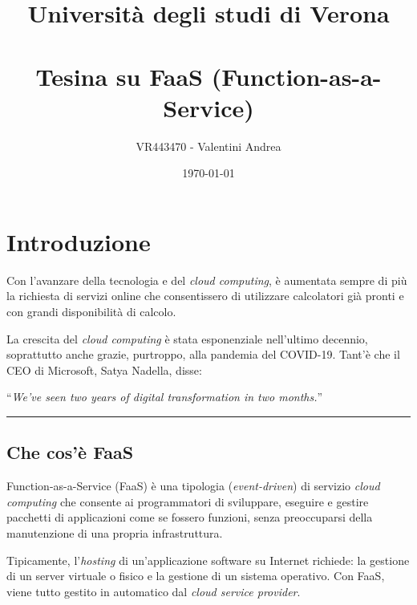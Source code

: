 \documentclass[a4paper]{article}
\newcommand{\longline}{\noindent\rule{\textwidth}{0.4pt}}
\newcommand{\dquotes}[1]{``#1''}
\begin{document}
	\author{VR443470 - Valentini Andrea}
	\title{Università degli studi di Verona \\
		\:\\
		Tesina su FaaS (Function-as-a-Service)}
	\date{\printdayoff\today}
	\maketitle
	
	\newpage
	
	\tableofcontents
	
	\newpage
	
	\section{Introduzione}
	
	Con l'avanzare della tecnologia e del \emph{cloud computing}, è aumentata sempre di più la richiesta di servizi online che consentissero di utilizzare calcolatori già pronti e con grandi disponibilità di calcolo.
	
	La crescita del \emph{cloud computing} è stata esponenziale nell'ultimo decennio, soprattutto anche grazie, purtroppo, alla pandemia del COVID-19. Tant'è che il CEO di Microsoft, Satya Nadella, disse:
	\begin{center}
		\dquotes{\emph{We’ve seen two years of digital transformation in two months.}}
	\end{center}
	
	\longline
	
	\subsection{Che cos'è FaaS}
	
	Function-as-a-Service (FaaS) è una tipologia (\emph{event-driven}) di servizio \emph{cloud computing} che consente ai programmatori di sviluppare, eseguire e gestire pacchetti di applicazioni come se fossero funzioni, senza preoccuparsi della manutenzione di una propria infrastruttura.
	
	Tipicamente, l'\emph{hosting} di un'applicazione software su Internet richiede: la gestione di un server virtuale o fisico e la gestione di un sistema operativo. Con FaaS, viene tutto gestito in automatico dal \emph{cloud service provider}.
	
\end{document}
